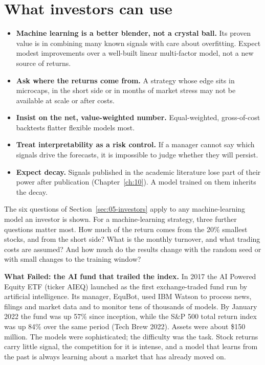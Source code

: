 \section{What investors can use}
\label{sec:21-investors}

\begin{itemize}
  \item \textbf{Machine learning is a better blender, not a crystal ball.} Its proven value is in combining many known signals with care about overfitting. Expect modest improvements over a well-built linear multi-factor model, not a new source of returns.
  \item \textbf{Ask where the returns come from.} A strategy whose edge sits in microcaps, in the short side or in months of market stress may not be available at scale or after costs.
  \item \textbf{Insist on the net, value-weighted number.} Equal-weighted, gross-of-cost backtests flatter flexible models most.
  \item \textbf{Treat interpretability as a risk control.} If a manager cannot say which signals drive the forecasts, it is impossible to judge whether they will persist.
  \item \textbf{Expect decay.} Signals published in the academic literature lose part of their power after publication (Chapter~\ref{ch:10}). A model trained on them inherits the decay.
\end{itemize}

The six questions of Section~\ref{sec:05-investors} apply to any machine-learning model an investor is shown. For a machine-learning strategy, three further questions matter most. How much of the return comes from the 20\% smallest stocks, and from the short side? What is the monthly turnover, and what trading costs are assumed? And how much do the results change with the random seed or with small changes to the training window?

\begin{callout}
\textbf{What Failed: the AI fund that trailed the index.} In 2017 the AI Powered Equity ETF (ticker AIEQ) launched as the first exchange-traded fund run by artificial intelligence. Its manager, EquBot, used IBM Watson to process news, filings and market data and to monitor tens of thousands of models. By January 2022 the fund was up 57\% since inception, while the S\&P 500 total return index was up 84\% over the same period (Tech Brew 2022). Assets were about \$150 million. The models were sophisticated; the difficulty was the task. Stock returns carry little signal, the competition for it is intense, and a model that learns from the past is always learning about a market that has already moved on.
\end{callout}

